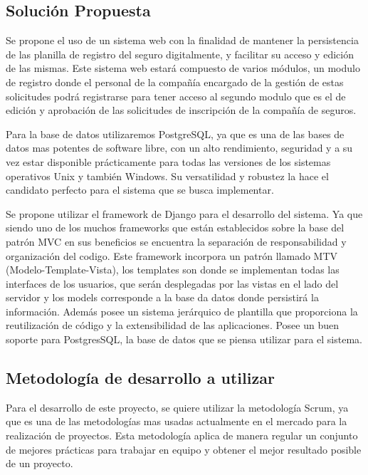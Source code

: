 \subsection{Solución Propuesta}
\setlength{\parskip}{5mm}
Se propone el uso de un sistema web con la finalidad de mantener la persistencia de las planilla de registro del seguro digitalmente, y facilitar su acceso y edición de las mismas. Este sistema web estará compuesto de varios módulos, un modulo de registro donde el personal de la compañía encargado de la gestión de estas solicitudes podrá registrarse para tener acceso al segundo modulo que es el de edición y aprobación de las solicitudes de inscripción de la compañía de seguros.

Para la base de datos utilizaremos PostgreSQL, ya que es una de las bases de datos mas potentes de software libre, con un alto rendimiento, seguridad y a su vez estar disponible prácticamente para todas las versiones de los sistemas operativos Unix y también Windows. Su versatilidad y robustez la hace el candidato perfecto para el sistema que se busca implementar.

Se propone utilizar el framework de Django para el desarrollo del sistema. Ya que siendo uno de los muchos frameworks que están establecidos sobre la base del patrón MVC en sus beneficios se encuentra la separación de responsabilidad y organización del codigo. Este framework incorpora un patrón llamado MTV (Modelo-Template-Vista), los templates son donde se implementan todas las interfaces de los usuarios, que serán desplegadas por las vistas en el lado del servidor y los models corresponde a la base da datos donde persistirá la información. Además posee un sistema jerárquico de plantilla que proporciona la reutilización de código y la extensibilidad de las aplicaciones. Posee un buen soporte para PostgresSQL, la base de datos que se piensa utilizar para el sistema. 

\setlength{\parskip}{0mm}



\subsection{Metodología de desarrollo a utilizar}


\setlength{\parskip}{5mm}
Para el desarrollo de este proyecto, se quiere utilizar la metodología Scrum, ya que es una de las metodologías mas usadas actualmente en el mercado para la realización de proyectos. Esta metodología aplica de manera regular un conjunto de mejores prácticas para trabajar en equipo y obtener el mejor resultado posible de un proyecto.

